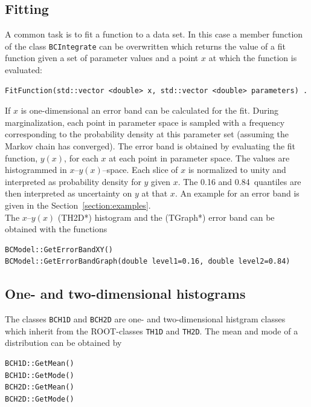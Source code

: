 \documentclass[11pt, a4paper]{article}
\begin{document}
\subsection{Fitting} 

A common task is to fit a function to a data set. In this case a member function of 
the class \verb|BCIntegrate| can be overwritten which returns the value of a fit function given 
a set of parameter values and a point $x$ at which the function is evaluated: 
%
\begin{verbatim}
FitFunction(std::vector <double> x, std::vector <double> parameters) . 
\end{verbatim}

\noindent 
If $x$ is one-dimensional an error band can be calculated for the fit. During 
marginalization, each point in parameter space is sampled with a frequency corresponding to the 
probability density at this parameter set (assuming the Markov chain has converged). The error band is obtained by 
evaluating the fit function, $y(x)$, for each $x$ at each point in parameter space. 
The values are histogrammed in $x$--$y(x)$--space. Each slice of $x$ is normalized to unity and interpreted as 
probability density for $y$ given $x$. The 0.16 and 0.84~quantiles are then interpreted as uncertainty on $y$ at that $x$. An example for an error band is given in the Section~\ref{section:examples}. \\ 

\noindent 
The $x$--$y(x)$ (TH2D*) histogram and the (TGraph*) error band can be obtained with the functions 
%
\begin{verbatim}
BCModel::GetErrorBandXY()
BCModel::GetErrorBandGraph(double level1=0.16, double level2=0.84) 
\end{verbatim}


\subsection{One- and two-dimensional histograms} 

The classes \verb|BCH1D| and \verb|BCH2D| are one- and two-dimensional
histgram classes which inherit from the ROOT-classes \verb|TH1D| and
\verb|TH2D|. The mean and mode of a distribution can be obtained by 
%
\begin{verbatim}
BCH1D::GetMean()
BCH1D::GetMode()
BCH2D::GetMean()
BCH2D::GetMode()
\end{verbatim} 
\end{document}
